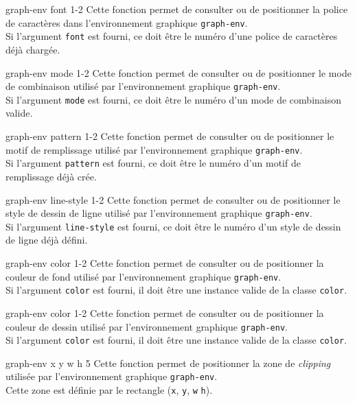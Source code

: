  {graph-env font} {1-2}
Cette fonction permet de consulter ou de positionner la police de caract\`{e}res 
dans l'environnement graphique {\tt graph-env}.\\
Si l'argument {\tt font} est fourni, ce doit \^{e}tre le num\'{e}ro d'une police de
caract\`{e}res d\'{e}j\`{a} charg\'{e}e.


 {graph-env mode} {1-2}
Cette fonction permet de consulter ou de positionner le mode de combinaison
utilis\'{e} par  l'environnement graphique {\tt graph-env}.\\
Si l'argument {\tt mode} est fourni, ce doit \^{e}tre le num\'{e}ro d'un mode de
combinaison valide.


 {graph-env pattern} {1-2}
Cette fonction permet de consulter ou de positionner le motif de remplissage
utilis\'{e} par  l'environnement graphique {\tt graph-env}.\\
Si l'argument {\tt pattern} est fourni, ce doit \^{e}tre le num\'{e}ro d'un motif de
remplissage d\'{e}j\`{a} cr\'{e}e.


 {graph-env line-style} {1-2}
Cette fonction permet de consulter ou de positionner le style de dessin de
ligne utilis\'{e} par  l'environnement graphique {\tt graph-env}.\\
Si l'argument {\tt line-style} est fourni, ce doit \^{e}tre le num\'{e}ro d'un style
de dessin de ligne d\'{e}j\`{a} d\'{e}fini.


 {graph-env color} {1-2}
Cette fonction permet de consulter ou de positionner la couleur de fond 
utilis\'{e} par  l'environnement graphique {\tt graph-env}.\\
Si l'argument {\tt color} est fourni, il doit \^{e}tre une instance valide de
la classe {\tt color}.


 {graph-env color} {1-2}
Cette fonction permet de consulter ou de positionner la couleur de dessin
utilis\'{e} par  l'environnement graphique {\tt graph-env}.\\
Si l'argument {\tt color} est fourni, il doit \^{e}tre une instance valide de
la classe {\tt color}.


 {graph-env x y w h} {5}
Cette fonction permet de positionner la zone de {\em clipping}
utilis\'{e}e par  l'environnement graphique {\tt graph-env}.\\
Cette zone est d\'{e}finie par le rectangle ({\tt x}, {\tt y}, {\tt w} {\tt h}).


